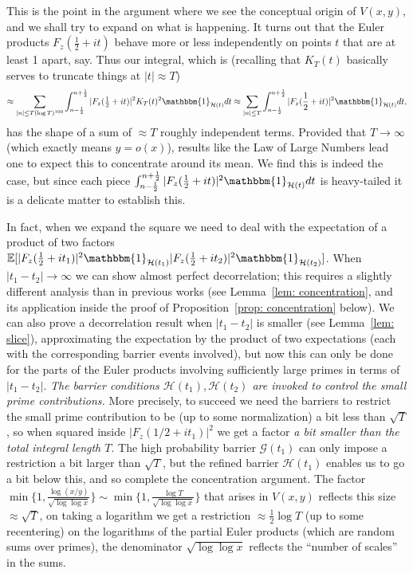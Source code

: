 \documentclass[12pt, notitlepage]{amsart}
\numberwithin{equation}{section}
\def\E{\mathbb E}
\theoremstyle{remark}
\theoremstyle{definition}
\theoremstyle{remark}
\numberwithin{equation}{section}
\begin{document}
This is the point in the argument where we see the conceptual origin of $V(x, y)$, and we shall try to expand on what is happening. It turns out that the Euler products $F_z(\frac 12+it)$ behave more or less independently on points $t$ that are at least 1 apart, say. Thus our integral, which is  (recalling that $K_T(t)$ basically serves to truncate things at $|t|\approx  T$)
$$
\approx \sum_{|n| \leq T(\log T)^{100}} \int_{n-\frac 12}^{n+\frac 12}|F_z(\tfrac 12+it)|^{2} K_T(t)^{2} \mathbbm{1}_{\mathcal{H}(t)} dt \approx \sum_{|n| \leq T} \int_{n-\frac 12}^{n+\frac 12}|F_z(\frac 12+it)|^{2} \mathbbm{1}_{\mathcal{H}(t)} dt,
$$
has the shape of a sum of $\approx T$ roughly independent terms. Provided that $T \rightarrow \infty$ (which exactly means $y=o(x)$), results like the Law of Large Numbers lead one to expect this to concentrate around its mean. We find this is indeed the case, but since each piece $\int_{n-\frac 12}^{n+\frac 12}|F_z(\frac 12+it)|^{2} \mathbbm{1}_{\mathcal{H}(t)} dt$ is heavy-tailed it is a delicate matter to establish this.

In fact, when we expand the square we need to deal with the expectation of a product of two factors $\E[|F_{z}(\frac 12+it_1)|^{2}\mathbbm{1}_{\mathcal{H}(t_1)} |F_{z}(\frac 12+it_2)|^{2} \mathbbm{1}_{\mathcal{H}(t_2)}]$. When $|t_1 - t_2| \rightarrow \infty$ we can show almost perfect decorrelation; this requires a slightly different analysis than in previous works (see Lemma~\ref{lem: concentration}, and its application inside the proof of Proposition~\ref{prop: concentration} below). We can also prove a decorrelation result when $|t_1-t_2|$ is smaller (see Lemma~\ref{lem: slice}), approximating the expectation by the product of two expectations (each with the corresponding barrier events involved), but now this can only be done for the parts of the Euler products involving sufficiently large primes in terms of $|t_1-t_2|$. {\em The barrier conditions $\mathcal{H}(t_1), \mathcal{H}(t_2)$ are invoked to control the small prime contributions.} More precisely, to succeed we need the barriers to restrict the small prime contribution to be (up to some normalization) a bit less than $\sqrt{T}$, so when squared inside $|F_{z}(1/2+it_1)|^{2}$ we get a factor {\em a bit smaller than the total integral length $T$}. The high probability barrier $\mathcal{G}(t_1)$ can only impose a restriction a bit larger than $\sqrt{T}$, but the refined barrier $\mathcal{H}(t_1)$ enables us to go a bit below this, and so complete the concentration argument. The factor $\min \{1, \frac{\log (x/y)}{\sqrt{\log \log x}}\} \sim \min \{1, \frac{\log T}{\sqrt{\log \log x}}\}$ that arises in $V(x, y)$ reflects this size $\approx \sqrt{T}$, on taking a logarithm we get a restriction $\approx \frac 12\log T$ (up to some recentering) on the logarithms of the partial Euler products (which are random sums over primes), the denominator $\sqrt{\log \log x}$ reflects the ``number of scales'' in the sums.
\end{document}
